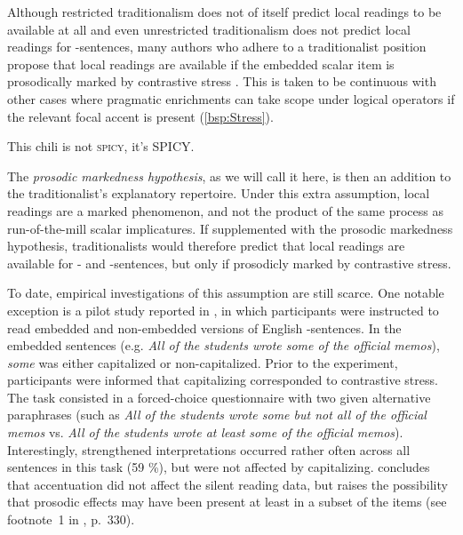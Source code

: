 \documentclass[fleqn,reqno,10pt]{article}
\newcommand{\as}{\acro{as}}
\renewcommand{\es}{\acro{es}}
\begin{document}
Although restricted traditionalism does not of itself predict local readings to be
available at all and even unrestricted traditionalism does not predict local
readings for \es-sentences,  many authors who adhere to a traditionalist position
propose that local readings are available if the embedded scalar item
is prosodically marked by contrastive stress \citep[e.g.][]{Horn2006:The-Border-Wars,Geurts2009:Scalar-Implicat,Geurts2010:Quantity-Implic,GeurtsTielvan-Tiel2013:Embedded-Scalar}. This
is taken to be continuous with other cases where pragmatic enrichments can
take scope under logical operators if the relevant focal accent is present (\ref{bsp:Stress}).

\begin{exe}
\ex \label{bsp:Stress} This chili is not \textsc{spicy}, it's \textsc{SPICY}.
\end{exe}

\noindent The \emph{prosodic markedness hypothesis}, as we will call
it here, is then an addition to the traditionalist's explanatory
repertoire. Under this extra assumption, local readings are a marked
phenomenon, and not the product of the same process as run-of-the-mill
scalar implicatures. If supplemented with the prosodic markedness
hypothesis, traditionalists would therefore predict that local
readings are available for \as- and \es-sentences, but only if
prosodicly marked by contrastive stress.

To date, empirical investigations of this assumption are still scarce.  One
notable exception is a pilot study reported in
\citet{Frazier08}, in which participants were instructed to read
embedded and non-embedded versions of English \as-sentences. In the
embedded sentences (e.g. {\it All of the students wrote some of the
  official memos}), {\it some} was either capitalized or
non-capitalized. Prior to the experiment, participants were informed
that capitalizing corresponded to contrastive stress. The task
consisted in a forced-choice questionnaire with two given alternative
paraphrases  (such as {\it All of the students wrote some but not all of the
  official memos} vs. {\it All of the students wrote at least some of
  the official memos}). Interestingly, strengthened interpretations
occurred rather often across all sentences in this task (59 \%), but
were not affected by capitalizing.
\citeauthor{Frazier08} concludes that accentuation did not affect the
silent reading data, but raises the possibility that prosodic effects
may have been present at least in a subset of the items (see
footnote~1 in \citet{Frazier08}, p.~330).
\end{document}
